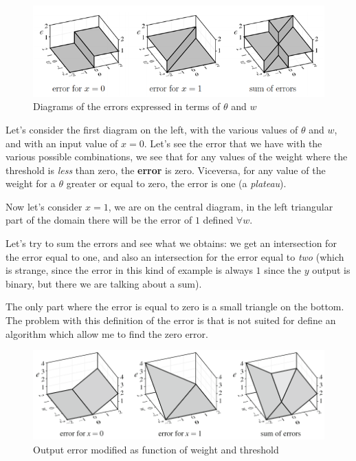 \documentclass{article}
\begin{document}
\begin{figure}[H]
    \centering
    \includegraphics[scale=0.7]{images/errors_exampl.png}
    \caption{Diagrams of the errors expressed in terms of $\theta$ and $w$}
    \label{fig:neg_tlu_errors}
\end{figure}
Let's consider the first diagram on the left, with the various values of $\theta$ and $w$, and
with an input value of $x=0$.
Let's see the error that we have with the various possible combinations, we see that
for any values of the weight where the threshold is \textit{less} than zero, the \textbf{error}
is zero. Viceversa, for any value of the weight for a $\theta$ greater or equal to zero, the
error is one (a \textit{plateau}).

Now let's consider $x=1$, we are on the central diagram, in the left triangular part
of the domain there will be the error of $1$ defined $\forall w$.

Let's try to sum the errors and see what we obtains: we get an intersection for the error
equal to one, and also an intersection for the error equal to \textit{two} (which is strange,
since the error in this kind of example is always $1$ since the $y$ output is binary, but there
we are talking about a sum).

The only part where the error is equal to zero is a small triangle on the bottom. The problem
with this definition of the error is that is not suited for define an algorithm which allow
me to find the zero error.

\begin{figure}[H]
    \includegraphics[scale=0.5]{images/desc_2_of_error.png}
    \centering
    \caption{Output error modified as function of weight and threshold}
\end{figure}
\end{document}
